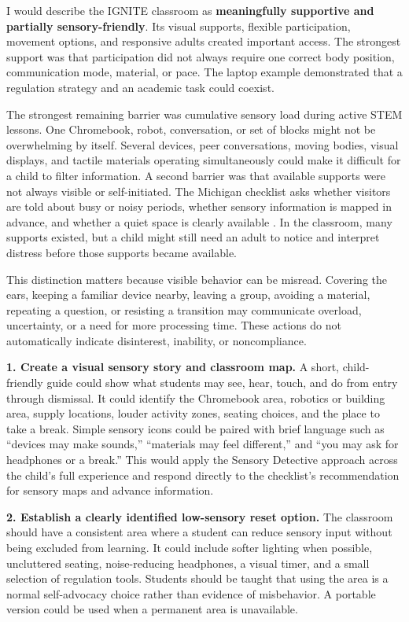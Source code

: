 \documentclass[11pt]{article}
\newcommand{\reviewsection}[1]{\vspace{0.07in}\noindent{\normalsize\bfseries\color{PrimaryRed}#1}\par\vspace{0.02in}}
\begin{document}
I would describe the IGNITE classroom as \textbf{meaningfully supportive and partially sensory-friendly}. Its visual supports, flexible participation, movement options, and responsive adults created important access. The strongest support was that participation did not always require one correct body position, communication mode, material, or pace. The laptop example demonstrated that a regulation strategy and an academic task could coexist.

The strongest remaining barrier was cumulative sensory load during active STEM lessons. One Chromebook, robot, conversation, or set of blocks might not be overwhelming by itself. Several devices, peer conversations, moving bodies, visual displays, and tactile materials operating simultaneously could make it difficult for a child to filter information. A second barrier was that available supports were not always visible or self-initiated. The Michigan checklist asks whether visitors are told about busy or noisy periods, whether sensory information is mapped in advance, and whether a quiet space is clearly available \citep{mddi_checklist}. In the classroom, many supports existed, but a child might still need an adult to notice and interpret distress before those supports became available.

This distinction matters because visible behavior can be misread. Covering the ears, keeping a familiar device nearby, leaving a group, avoiding a material, repeating a question, or resisting a transition may communicate overload, uncertainty, or a need for more processing time. These actions do not automatically indicate disinterest, inability, or noncompliance.

\reviewsection{Recommendations}

\textbf{1. Create a visual sensory story and classroom map.} A short, child-friendly guide could show what students may see, hear, touch, and do from entry through dismissal. It could identify the Chromebook area, robotics or building area, supply locations, louder activity zones, seating choices, and the place to take a break. Simple sensory icons could be paired with brief language such as ``devices may make sounds,'' ``materials may feel different,'' and ``you may ask for headphones or a break.'' This would apply the Sensory Detective approach across the child's full experience and respond directly to the checklist's recommendation for sensory maps and advance information.

\textbf{2. Establish a clearly identified low-sensory reset option.} The classroom should have a consistent area where a student can reduce sensory input without being excluded from learning. It could include softer lighting when possible, uncluttered seating, noise-reducing headphones, a visual timer, and a small selection of regulation tools. Students should be taught that using the area is a normal self-advocacy choice rather than evidence of misbehavior. A portable version could be used when a permanent area is unavailable.
\end{document}
